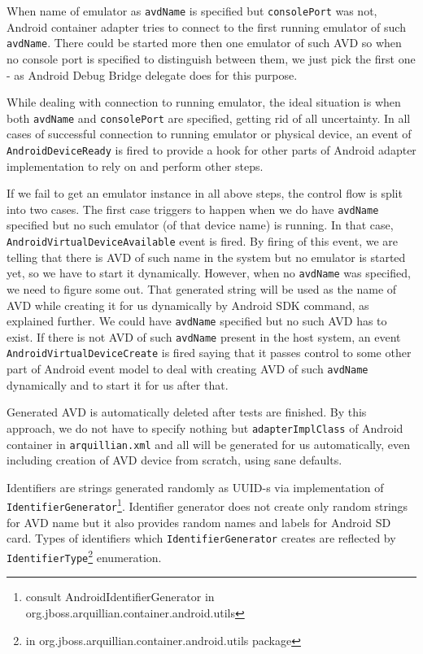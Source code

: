 \documentclass[12pt,final,oneside]{fithesis}
\begin{document}
When name of emulator as \texttt{avdName} is specified but \texttt{consolePort} was not, Android container adapter tries to connect to the first running emulator of such \texttt{avdName}. There could be started more then one emulator of such AVD so when no console port is specified to distinguish between them, we just pick the first one - as Android Debug Bridge delegate does for this purpose.

While dealing with connection to running emulator, the ideal situation is when both \texttt{avdName} and \texttt{consolePort} are specified, getting rid of all uncertainty. In all cases of successful connection to running emulator or physical device, an event of \texttt{AndroidDeviceReady} is fired to provide a hook for other parts of Android adapter implementation to rely on and perform other steps.

If we fail to get an emulator instance in all above steps, the control flow is split into two cases. The first case triggers to happen when we do have \texttt{avdName} specified but no such emulator (of that device name) is running. In that case, \texttt{AndroidVirtualDeviceAvailable} event is fired. By firing of this event, we are telling that there is AVD of such name in the system but no emulator is started yet, so we have to start it dynamically. However, when no \texttt{avdName} was specified, we need to figure some out. That generated string will be used as the name of AVD while creating it for us dynamically by Android SDK command, as explained further. We could have \texttt{avdName} specified but no such AVD has to exist. If there is not AVD of such \texttt{avdName} present in the host system, an event \texttt{AndroidVirtualDeviceCreate} is fired saying that it passes control to some other part of Android event model to deal with creating AVD of such \texttt{avdName} dynamically and to start it for us after that.

Generated AVD is automatically deleted after tests are finished. By this approach, we do not have to specify nothing but \texttt{adapterImplClass} of Android container in \texttt{arquillian.xml} and all will be generated for us automatically, even including creation of AVD device from scratch, using sane defaults.

Identifiers are strings generated randomly as UUID-s via implementation of \texttt{IdentifierGenerator}\footnote{consult AndroidIdentifierGenerator in org.jboss.arquillian.container.android.utils}. Identifier generator does not create only random strings for AVD name but it also provides random names and labels for Android SD card. Types of identifiers which \texttt{IdentifierGenerator} creates are reflected by \texttt{IdentifierType}\footnote{in org.jboss.arquillian.container.android.utils package} enumeration.
\end{document}
